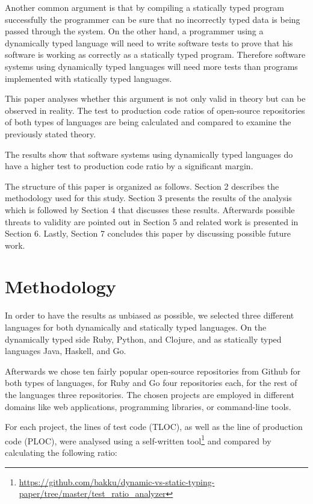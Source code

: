 \documentclass[conference]{IEEEtran}
\begin{document}
Another common argument is that by compiling a statically typed program successfully the programmer can be sure that no incorrectly typed data is being passed through the system. On the other hand, a programmer using a dynamically typed language will need to write software tests to prove that his software is working as correctly as a statically typed program. Therefore software systems using dynamically typed languages will need more tests than programs implemented with statically typed languages.\cite{cardelli_luca_type_systems}

This paper analyses whether this argument is not only valid in theory but can be observed in reality. The test to production code ratios of open-source repositories of both types of languages are being calculated and compared to examine the previously stated theory.

The results show that software systems using dynamically typed languages do have a higher test to production code ratio by a significant margin.

The structure of this paper is organized as follows. Section 2 describes the methodology used for this study. Section 3 presents the results of the analysis which is followed by Section 4 that discusses these results. Afterwards possible threats to validity are pointed out in Section 5 and related work is presented in Section 6. Lastly, Section 7 concludes this paper by discussing possible future work.

\section{Methodology}

In order to have the results as unbiased as possible, we selected three different languages for both dynamically and statically typed languages. On the dynamically typed side Ruby, Python, and Clojure, and as statically typed languages Java, Haskell, and Go.

Afterwards we chose ten fairly popular open-source repositories from Github for both types of languages, for Ruby and Go four repositories each, for the rest of the languages three repositories. The chosen projects are employed in different domains like web applications, programming libraries, or command-line tools.

For each project, the lines of test code (TLOC), as well as the line of production code (PLOC), were analysed using a self-written tool\footnote{\url{https://github.com/bakku/dynamic-vs-static-typing-paper/tree/master/test\_ratio\_analyzer}} and compared by calculating the following ratio:
\end{document}
